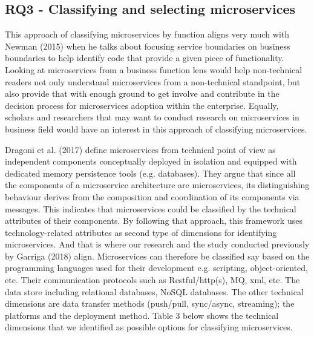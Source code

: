\documentclass{article}
\begin{document}
\subsection{RQ3 - Classifying and selecting microservices}

This approach of classifying microservices by function aligns very much with Newman (2015) when he talks about focusing service boundaries on business boundaries to help identify code that provide a given piece of functionality. Looking at microservices from a business function lens would help non-technical readers not only understand microservices from a non-technical standpoint, but also provide that with enough ground to get involve and contribute in the decision process for microservices adoption within the enterprise. Equally, scholars and researchers that may want to conduct research on microservices in business field would have an interest in this approach of classifying microservices.

Dragoni et al. (2017) define microservices from technical point of view as independent components conceptually deployed in isolation and equipped with dedicated memory persistence tools (e.g. databases). They argue that since all the components of a microservice architecture are microservices, its distinguishing behaviour derives from the composition and coordination of its components via messages. This indicates that microservices could be classified by the technical attributes of their components. By following that approach, this framework uses technology-related attributes as second type of dimensions for identifying microservices. And that is where our research and the study conducted previously by Garriga (2018) align. Microservices can therefore be classified say based on the programming languages used for their development e.g. scripting, object-oriented, etc. Their communication protocols such as Restful/http(s), MQ, xml, etc. The data store including relational databases, NoSQL databases. The other technical dimensions are data transfer methods (push/pull, sync/async, streaming); the platforms and the deployment method. Table 3 below shows the technical dimensions that we identified as possible options for classifying microservices.
\end{document}
